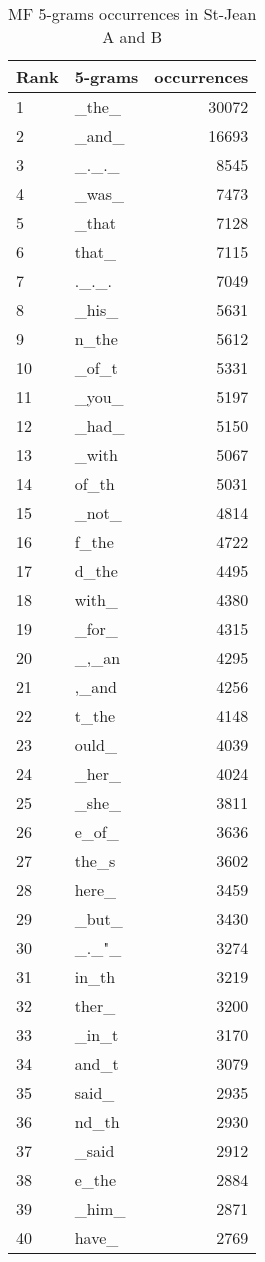 \begin{table}
  \centering
  \caption{MF 5-grams occurrences in St-Jean A and B}
  \label{tab:5_grams_occurences_st_jean}
  \begin{tabular}{l l r}
    \toprule
    Rank & 5-grams & occurrences \\
    \midrule
    1 & \_the\_ & 30072 \\
    2 & \_and\_ & 16693 \\
    3 & \_.\_.\_ & 8545 \\
    4 & \_was\_ & 7473 \\
    5 & \_that & 7128 \\
    6 & that\_ & 7115 \\
    7 & .\_.\_. & 7049 \\
    8 & \_his\_ & 5631 \\
    9 & n\_the & 5612 \\
    10 & \_of\_t & 5331 \\
    11 & \_you\_ & 5197 \\
    12 & \_had\_ & 5150 \\
    13 & \_with & 5067 \\
    14 & of\_th & 5031 \\
    15 & \_not\_ & 4814 \\
    16 & f\_the & 4722 \\
    17 & d\_the & 4495 \\
    18 & with\_ & 4380 \\
    19 & \_for\_ & 4315 \\
    20 & \_,\_an & 4295 \\
    21 & ,\_and & 4256 \\
    22 & t\_the & 4148 \\
    23 & ould\_ & 4039 \\
    24 & \_her\_ & 4024 \\
    25 & \_she\_ & 3811 \\
    26 & e\_of\_ & 3636 \\
    27 & the\_s & 3602 \\
    28 & here\_ & 3459 \\
    29 & \_but\_ & 3430 \\
    30 & \_.\_"\_ & 3274 \\
    31 & in\_th & 3219 \\
    32 & ther\_ & 3200 \\
    33 & \_in\_t & 3170 \\
    34 & and\_t & 3079 \\
    35 & said\_ & 2935 \\
    36 & nd\_th & 2930 \\
    37 & \_said & 2912 \\
    38 & e\_the & 2884 \\
    39 & \_him\_ & 2871 \\
    40 & have\_ & 2769 \\
    \bottomrule
  \end{tabular}
\end{table}


